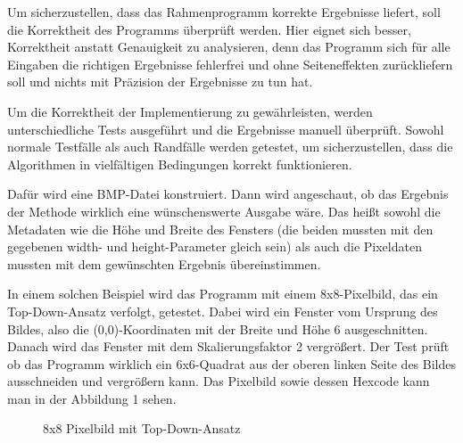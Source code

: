 \documentclass[course=erap]{aspdoc}
\begin{document}
    Um sicherzustellen, dass das Rahmenprogramm korrekte Ergebnisse liefert, soll die Korrektheit des Programms überprüft werden.
    Hier eignet sich besser, Korrektheit anstatt Genauigkeit zu analysieren, denn das Programm sich für alle Eingaben die richtigen
    Ergebnisse fehlerfrei und ohne Seiteneffekten zurückliefern soll und nichts mit Präzision der Ergebnisse zu tun hat.

    Um die Korrektheit der Implementierung zu gewährleisten, werden unterschiedliche Tests ausgeführt und die Ergebnisse manuell
    überprüft. Sowohl normale Testfälle als auch Randfälle werden getestet, um sicherzustellen, dass die Algorithmen in vielfältigen
    Bedingungen korrekt funktionieren.

    Dafür wird eine BMP-Datei konstruiert. Dann wird angeschaut, ob das Ergebnis der Methode wirklich eine wünschenswerte Ausgabe wäre.
    Das heißt sowohl die Metadaten wie die Höhe und Breite des Fensters (die beiden mussten mit den gegebenen width- und height-Parameter
    gleich sein) als auch die Pixeldaten mussten mit dem gewünschten Ergebnis übereinstimmen.

    In einem solchen Beispiel wird das Programm mit einem 8x8-Pixelbild, das ein Top-Down-Ansatz verfolgt, getestet. Dabei wird ein
    Fenster vom Ursprung des Bildes, also die (0,0)-Koordinaten mit der Breite und Höhe 6 ausgeschnitten. Danach wird das Fenster
    mit dem Skalierungsfaktor 2 vergrößert. Der Test prüft ob das Programm wirklich ein 6x6-Quadrat aus der oberen linken Seite des
    Bildes ausschneiden und vergrößern kann. Das Pixelbild sowie dessen Hexcode kann man in der Abbildung 1 sehen.

    \begin{figure}[ht]%
        \centering
        \qquad
        \caption{8x8 Pixelbild mit Top-Down-Ansatz~\cite{SampleBmpFiles}}%
        \label{fig:enter-label}
    \end{figure}
\end{document}
